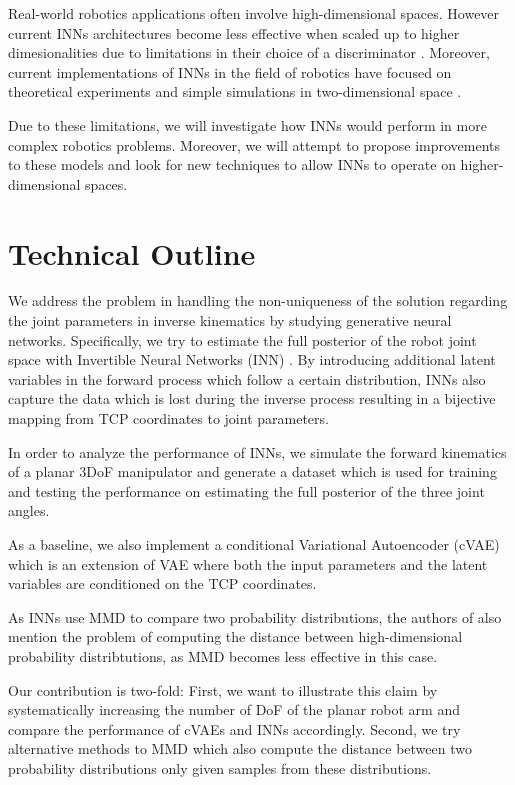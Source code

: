 \documentclass[conference]{IEEEtran}
\begin{document}
Real-world robotics applications often involve high-dimensional spaces.
However current INNs architectures become less effective when scaled up to higher dimesionalities
due to limitations in their choice of a discriminator \cite{Ardizzone2018}.
Moreover, current implementations of INNs in the field of robotics have focused on theoretical experiments
and simple simulations in two-dimensional space \cite{Ardizzone2018}.

Due to these limitations, we will investigate how INNs would perform in more complex robotics problems.
Moreover, we will attempt to propose improvements to these models and look for new techniques to allow
INNs to operate on higher-dimensional spaces.

\section*{Technical Outline}

We address the problem in handling the non-uniqueness of the solution regarding the joint parameters in inverse kinematics by studying generative neural networks. Specifically, we try to estimate the full posterior of the robot joint space with Invertible Neural Networks (INN) \cite{Ardizzone2018}. By introducing additional latent variables in the forward process which follow a certain distribution, INNs also capture the data which is lost during the inverse process resulting in a bijective mapping from TCP coordinates to joint parameters.

In order to analyze the performance of INNs, we simulate the forward kinematics of a planar 3DoF manipulator and generate a dataset which is used for training and testing the performance on estimating the full posterior of the three joint angles.

As a baseline, we also implement a conditional Variational Autoencoder (cVAE) \cite{Sohn2015} which is an extension of VAE where both the input parameters and the latent variables are conditioned on the TCP coordinates.

As INNs use MMD to compare two probability distributions, the authors of \cite{Ardizzone2018} also mention the problem of computing the distance between high-dimensional probability distribtutions, as MMD becomes less effective in this case.

Our contribution is two-fold: First, we want to illustrate this claim by systematically increasing the number of DoF of the planar robot arm and compare the performance of cVAEs and INNs accordingly. Second, we try alternative methods to MMD which also compute the distance between two probability distributions only given samples from these distributions.



\end{document}
